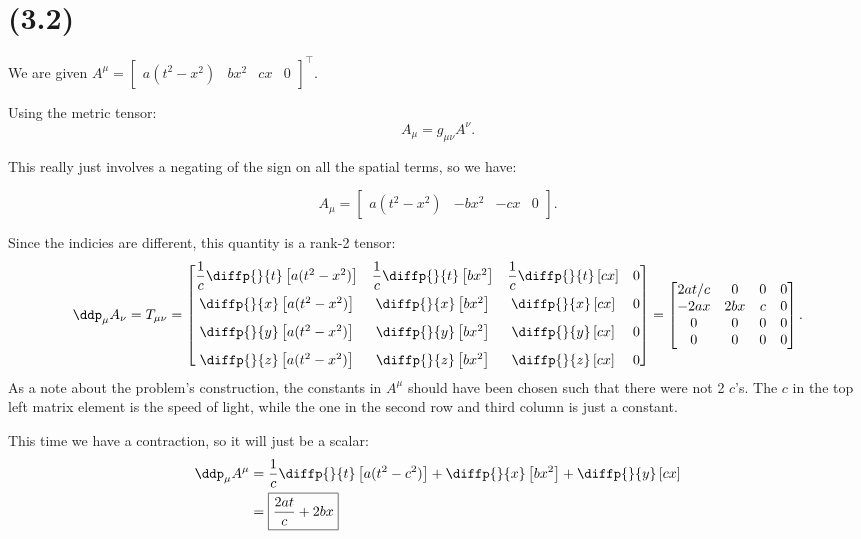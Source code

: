 
\section{(3.2)}
We are given $A^{\mu} = \begin{bmatrix} a(t^2 - x^2) & bx^2 & cx & 0 \end{bmatrix}^{\intercal}$.

\begin{parts}

\item Using the metric tensor:
    \begin{equation}
        A_{\mu} = g_{\mu\nu} A^{\nu}.      
    \end{equation}

    This really just involves a negating of the sign on all the spatial terms, so we have:

    \begin{equation}
        A_{\mu} = \begin{bmatrix}a(t^2 - x^2) & -bx^2 & -cx & 0 \end{bmatrix}.
    \end{equation}


\item Since the indicies are different, this quantity is a rank-2 tensor:
    \begin{equation}
        \ddp_{\mu}A_{\nu} = T_{\mu\nu} = 
        \begin{bmatrix}
            \dfrac{1}{c}\diffp{}{t} \left[a(t^2 - x^2)\right] & \dfrac{1}{c}\diffp{}{t} \left[bx^2\right] & \dfrac{1}{c}\diffp{}{t} \left[cx\right] & 0 \\[8pt]
            \diffp{}{x} \left[a(t^2 - x^2)\right] & \diffp{}{x} \left[bx^2\right] & \diffp{}{x} \left[cx\right] & 0 \\[8pt]
            \diffp{}{y} \left[a(t^2 - x^2)\right] & \diffp{}{y} \left[bx^2\right] & \diffp{}{y} \left[cx\right] & 0 \\[8pt]
            \diffp{}{z} \left[a(t^2 - x^2)\right] & \diffp{}{z} \left[bx^2\right] & \diffp{}{z} \left[cx\right] & 0 
        \end{bmatrix}
        =
        \begin{bmatrix}
            2at/c & 0 & 0 & 0 \\
            -2ax & 2bx & c & 0 \\
            0 & 0 & 0 & 0 \\
            0 & 0 & 0 & 0
        \end{bmatrix}.
    \end{equation}
    As a note about the problem's construction, the constants in $A^{\mu}$ should have been chosen such that there were not 2 $c$'s. The $c$ in the top left matrix element is the speed of light, while the one in the second row and third column is just a constant.


\item This time we have a contraction, so it will just be a scalar:
    \begin{align}
        \ddp_{\mu}A^{\mu} &= \frac{1}{c}\diffp{}{t} \left[a(t^2 - c^2)\right] + \diffp{}{x}\left[bx^2\right] + \diffp{}{y} \left[cx\right] \\
        &= \boxed{\frac{2at}{c} + 2bx}
    \end{align}

\end{parts}